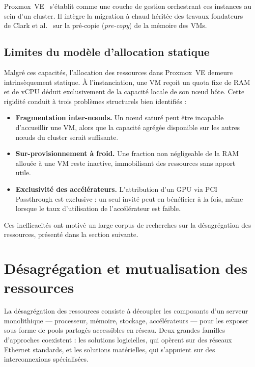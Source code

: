 Proxmox~VE~\cite{proxmox_doc} s'établit comme une couche de gestion orchestrant ces instances au sein d'un cluster. Il intègre la migration à chaud héritée des travaux fondateurs de Clark et al.~\cite{clark_2005} sur la pré-copie (\textit{pre-copy}) de la mémoire des VMs.

\subsection{Limites du modèle d'allocation statique}

Malgré ces capacités, l'allocation des ressources dans Proxmox~VE demeure intrinsèquement statique. À l'instanciation, une VM reçoit un quota fixe de RAM et de vCPU déduit exclusivement de la capacité locale de son nœud hôte. Cette rigidité conduit à trois problèmes structurels bien identifiés :

\begin{itemize}
    \item \textbf{Fragmentation inter-nœuds.} Un nœud saturé peut être incapable d'accueillir une VM, alors que la capacité agrégée disponible sur les autres nœuds du cluster serait suffisante.
    \item \textbf{Sur-provisionnement à froid.} Une fraction non négligeable de la RAM allouée à une VM reste inactive, immobilisant des ressources sans apport utile.
    \item \textbf{Exclusivité des accélérateurs.} L'attribution d'un GPU via PCI Passthrough est exclusive : un seul invité peut en bénéficier à la fois, même lorsque le taux d'utilisation de l'accélérateur est faible.
\end{itemize}

Ces inefficacités ont motivé un large corpus de recherches sur la désagrégation des ressources, présenté dans la section suivante.

\section{Désagrégation et mutualisation des ressources}
\label{sec:desagregation-memoire}

La désagrégation des ressources consiste à découpler les composants d'un serveur monolithique — processeur, mémoire, stockage, accélérateurs — pour les exposer sous forme de pools partagés accessibles en réseau. Deux grandes familles d'approches coexistent : les solutions logicielles, qui opèrent sur des réseaux Ethernet standards, et les solutions matérielles, qui s'appuient sur des interconnexions spécialisées.

